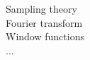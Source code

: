 \documentclass[preview]{standalone}
\begin{document}
Sampling theory\\Fourier transform\\Window functions\\...\\
\end{document}
